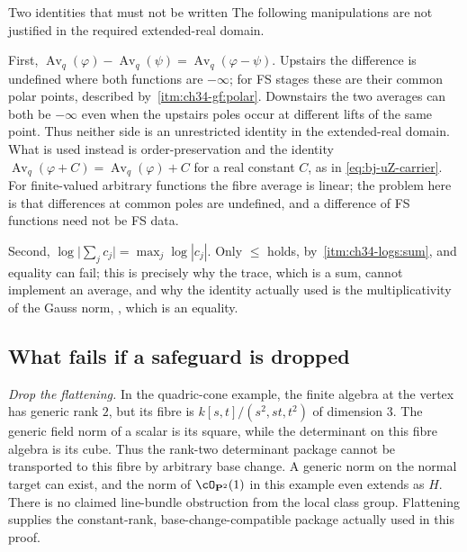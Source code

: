 \begin{warning}{Two identities that must not be written}
\label{warn:ch41-forbidden-identities}
The following manipulations are not justified in the required
extended-real domain.

First, $\operatorname{Av}_q(\varphi)-\operatorname{Av}_q(\psi)
=\operatorname{Av}_q(\varphi-\psi)$.  Upstairs the difference is
undefined where both functions are $-\infty$; for FS stages these
are their common polar points, described by
\,\cref{itm:ch34-gf:polar}.
Downstairs the two averages can both be $-\infty$ even when the
upstairs poles occur at different lifts of the same point.
Thus neither side is an unrestricted identity in the extended-real
domain.  What is used instead is order-preservation and the
identity $\operatorname{Av}_q(\varphi+C)=\operatorname{Av}_q(\varphi)+C$
for a real constant $C$, as in \eqref{eq:bj-uZ-carrier}.
For finite-valued arbitrary functions the fibre average is linear;
the problem here is that differences at common poles are undefined,
and a difference of FS functions need not be FS data.

Second, $\log\bigl|\sum_jc_j\bigr|=\max_j\log|c_j|$.  Only $\le$ holds,
by \,\cref{itm:ch34-logs:sum}, and equality
can fail; this is precisely why the trace, which is a sum, cannot implement
an average, and why the identity actually used is the multiplicativity of
the Gauss norm, , which is an equality.
\end{warning}

\subsection{What fails if a safeguard is dropped}
\label{sec:ch41-safeguard-failures}

\emph{Drop the flattening.}  In the quadric-cone example, the finite
algebra at the vertex has generic rank $2$, but its fibre is
$k[s,t]/(s^2,st,t^2)$ of dimension $3$.
The generic field norm of a scalar is its square, while the determinant
on this fibre algebra is its cube.  Thus the rank-two determinant
package cannot be transported to this fibre by arbitrary base change.
A generic norm on the normal target can exist, and the norm of
$\cO_{\mathbf P^2}(1)$ in this example even extends as $H$.
There is no claimed line-bundle obstruction from the local class group.
Flattening supplies the constant-rank, base-change-compatible package
actually used in this proof.

